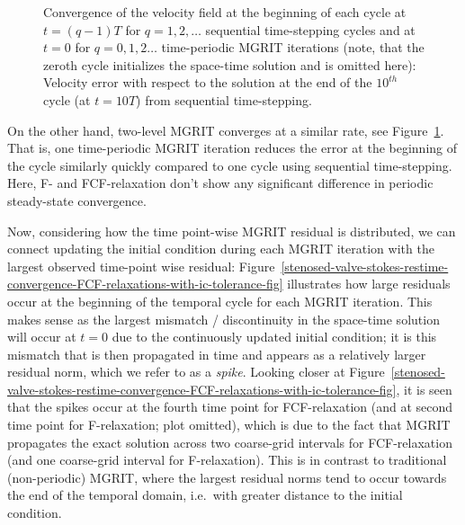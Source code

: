 \documentclass[3p]{elsarticle}
\begin{document}
\begin{figure}[ht!]
    \caption{Convergence of the velocity field at the beginning of each cycle
        at $t = (q - 1) T$ for $q = 1, 2, \ldots$ sequential time-stepping cycles
        and at $t = 0$ for $q = 0, 1, 2 \ldots$ time-periodic MGRIT iterations (note,
        that the zeroth cycle initializes the space-time solution and is omitted here):
        Velocity error with respect to the solution
        at the end of the $10^{th}$ cycle (at $t = 10 T$) from sequential time-stepping.}
    \label{stenosed-valve-error-ic-stokes-seq-vs-pint-fig}
\end{figure}
\FloatBarrier

On the other hand, two-level MGRIT
converges at a similar rate, see Figure~\ref{stenosed-valve-error-ic-stokes-seq-vs-pint-fig}.
That is, one time-periodic MGRIT iteration reduces the error at the beginning of the cycle
similarly quickly compared to one cycle using sequential time-stepping.
Here, F- and FCF-relaxation don't show any significant difference in periodic steady-state
convergence.

Now, considering how the time point-wise MGRIT residual is distributed,
we can connect updating the initial condition during each MGRIT iteration
with the largest observed time-point wise residual:
Figure~\ref{stenosed-valve-stokes-restime-convergence-FCF-relaxations-with-ic-tolerance-fig}
illustrates how large residuals occur at the beginning of the temporal cycle for each MGRIT iteration.
This makes sense as the largest mismatch / discontinuity in the space-time solution will occur
at $t = 0$ due to the continuously updated initial condition; it is this mismatch that is then propagated
in time and appears as a relatively larger residual norm, which we refer to as a \emph{spike}.
Looking closer at Figure~\ref{stenosed-valve-stokes-restime-convergence-FCF-relaxations-with-ic-tolerance-fig},
it is seen that the spikes occur at the fourth time point for FCF-relaxation
(and at second time point for F-relaxation; plot omitted),
which is due to the fact that MGRIT propagates the exact solution across two coarse-grid intervals
for FCF-relaxation (and one coarse-grid interval for F-relaxation).
This is in contrast to traditional (non-periodic) MGRIT,
where the largest residual norms tend to occur towards the end of the temporal domain,
i.e.\ with greater distance to the initial condition.
\end{document}
